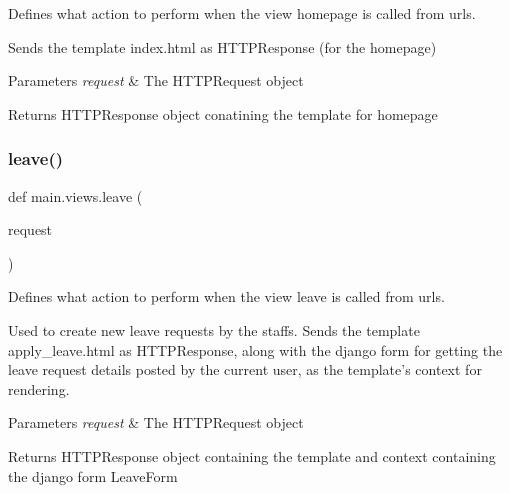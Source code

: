 Defines what action to perform when the view \textquotesingle{}homepage\textquotesingle{} is called from urls. 

Sends the template index.\+html as H\+T\+T\+P\+Response (for the homepage)


\begin{DoxyParams}{Parameters}
{\em request} & The H\+T\+T\+P\+Request object \\
\hline
\end{DoxyParams}
\begin{DoxyReturn}{Returns}
H\+T\+T\+P\+Response object conatining the template for homepage 
\end{DoxyReturn}
\mbox{\label{namespacemain_1_1views_a0e05992f5c64ffb3cd35ddc581399e31}} 
\subsubsection{\texorpdfstring{leave()}{leave()}}
{\footnotesize\ttfamily def main.\+views.\+leave (\begin{DoxyParamCaption}\item[{}]{request }\end{DoxyParamCaption})}



Defines what action to perform when the view \textquotesingle{}leave\textquotesingle{} is called from urls. 

Used to create new leave requests by the staffs. Sends the template apply\+\_\+leave.\+html as H\+T\+T\+P\+Response, along with the django form for getting the leave request details posted by the current user, as the template’s context for rendering. 
\begin{DoxyParams}{Parameters}
{\em request} & The H\+T\+T\+P\+Request object \\
\hline
\end{DoxyParams}
\begin{DoxyReturn}{Returns}
H\+T\+T\+P\+Response object containing the template and context containing the django form Leave\+Form 
\end{DoxyReturn}
\mbox{\label{namespacemain_1_1views_acdd49ab16815f9d6cb3e88feab0bfa80}} 
